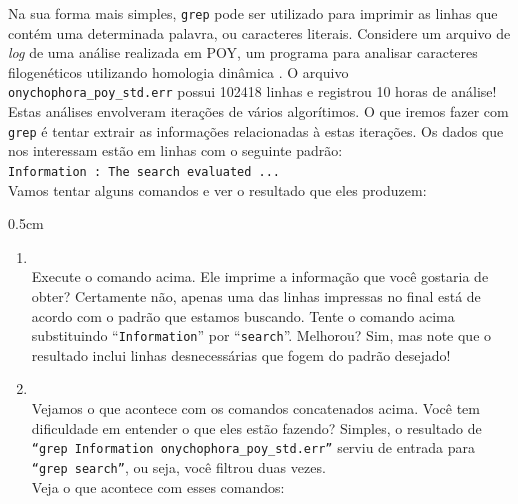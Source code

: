 \begin{refsection}
Na sua forma mais simples, \texttt{grep} pode ser utilizado para imprimir as linhas que contém uma determinada palavra, ou caracteres literais. Considere um arquivo de \textit{log} de uma análise realizada em POY, um programa para analisar caracteres filogenéticos utilizando homologia dinâmica \parencite{VaronETAL_2010}. O arquivo \texttt{onychophora\_poy\_std.err} possui 102418 linhas e registrou 10 horas de análise! Estas análises envolveram iterações de vários algorítimos. O que iremos fazer com \texttt{grep} é tentar extrair as informações relacionadas à estas iterações. Os dados que nos interessam estão em linhas com o seguinte padrão:\\

\texttt{Information : The search evaluated ...}\\

Vamos tentar alguns comandos e ver o resultado que eles produzem:

\begin {myindentpar}{0.5cm}
\begin{enumerate}[\itshape i.]

 \item {}\label{tut2:text:editors:texttools:grep:ex1}\\	
	Execute o comando acima. Ele imprime a informação que você gostaria de obter? Certamente não, apenas uma das linhas impressas no final está de acordo com o padrão que estamos buscando. Tente o comando acima substituindo ``\texttt{Information}'' por ``\texttt{search}''. Melhorou? Sim, mas note que o resultado inclui linhas desnecessárias que fogem do padrão desejado!

 \item {}\label{tut2:text:editors:texttools:grep:ex2}\\
	Vejamos o que acontece com os comandos concatenados acima. Você tem dificuldade em entender o que eles estão fazendo? Simples, o resultado de \texttt{``grep Information onychophora\_poy\_std.err''} serviu de entrada para \texttt{``grep search''}, ou seja, você filtrou duas vezes.\\

Veja o que acontece com esses comandos:\\
 \\

 \\


\end{enumerate}
\end{myindentpar}
\end{refsection}
